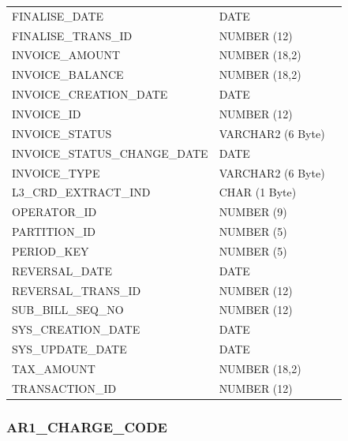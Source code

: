 \documentclass[12pt,twoside]{article}
\begin{document}
\begin{longtable}{lll}
 FINALISE\_DATE                 &  DATE                 &                        \\
 FINALISE\_TRANS\_ID            &  NUMBER (12)          &                        \\
 INVOICE\_AMOUNT                &  NUMBER (18,2)        &                        \\
 INVOICE\_BALANCE               &  NUMBER (18,2)        &                        \\
 INVOICE\_CREATION\_DATE        &  DATE                 &                        \\
 INVOICE\_ID                    &  NUMBER (12)          &                        \\
 INVOICE\_STATUS                &  VARCHAR2 (6 Byte)    &                        \\
 INVOICE\_STATUS\_CHANGE\_DATE  &  DATE                 &                        \\
 INVOICE\_TYPE                  &  VARCHAR2 (6 Byte)    &                        \\
 L3\_CRD\_EXTRACT\_IND          &  CHAR (1 Byte)        &                        \\
 OPERATOR\_ID                   &  NUMBER (9)           &                        \\
 PARTITION\_ID                  &  NUMBER (5)           &                        \\
 PERIOD\_KEY                    &  NUMBER (5)           &                        \\
 REVERSAL\_DATE                 &  DATE                 &                        \\
 REVERSAL\_TRANS\_ID            &  NUMBER (12)          &                        \\
 SUB\_BILL\_SEQ\_NO             &  NUMBER (12)          &                        \\
 SYS\_CREATION\_DATE            &  DATE                 &                        \\
 SYS\_UPDATE\_DATE              &  DATE                 &                        \\
 TAX\_AMOUNT                    &  NUMBER (18,2)        &                        \\
 TRANSACTION\_ID                &  NUMBER (12)          &                        \\
\hline
\end{longtable}

\normalsize
\subsubsection{AR1\_CHARGE\_CODE}
\label{sec-11-6-3}
\end{document}
